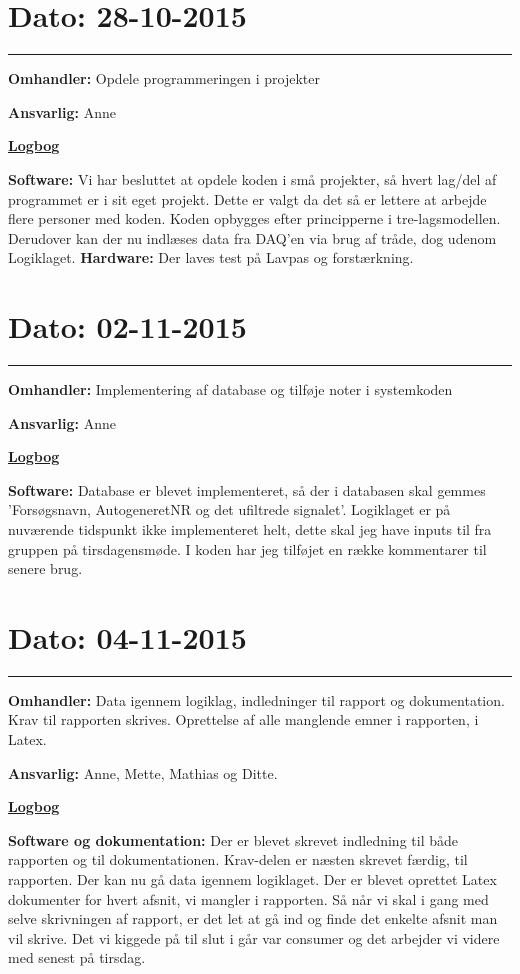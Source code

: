 \newpage
\section{Dato: 28-10-2015}
\hrule
\textbf{Omhandler:} Opdele programmeringen i projekter

\textbf{Ansvarlig:} Anne

\underline{\textbf{Logbog}}

\textbf{Software: }Vi har besluttet at opdele koden i små projekter, så hvert lag/del af programmet er i sit eget projekt. Dette er valgt da det så er lettere at arbejde flere personer med koden. Koden opbygges efter principperne i tre-lagsmodellen. Derudover kan der nu indlæses data fra DAQ'en via brug af tråde, dog udenom Logiklaget. 
\textbf{Hardware: } Der laves test på Lavpas og forstærkning.  
\\

\section{Dato: 02-11-2015}
\hrule
\textbf{Omhandler:} Implementering af database og tilføje noter i systemkoden

\textbf{Ansvarlig:} Anne

\underline{\textbf{Logbog}}

\textbf{Software: }Database er blevet implementeret, så der i databasen skal gemmes 'Forsøgsnavn, AutogeneretNR og det ufiltrede signalet'. Logiklaget er på nuværende tidspunkt ikke implementeret helt, dette skal jeg have inputs til fra gruppen på tirsdagensmøde.  
I koden har jeg tilføjet en række kommentarer til senere brug.
\\

\section{Dato: 04-11-2015}
\hrule
\textbf{Omhandler:} Data igennem logiklag, indledninger til rapport og dokumentation. Krav til rapporten skrives. 
Oprettelse af alle manglende emner i rapporten, i Latex. 

\textbf{Ansvarlig:} Anne, Mette, Mathias og Ditte. 

\underline{\textbf{Logbog}}

\textbf{Software og dokumentation: }Der er blevet skrevet indledning til både rapporten og til dokumentationen. Krav-delen er næsten skrevet færdig, til rapporten. 
Der kan nu gå data igennem logiklaget. 
Der er blevet oprettet Latex dokumenter for hvert afsnit, vi mangler i rapporten. Så når vi skal i gang med selve skrivningen af rapport, er det let at gå ind og finde det enkelte afsnit man vil skrive. 
Det vi kiggede på til slut i går var consumer og det arbejder vi videre med senest på tirsdag. 
\\

